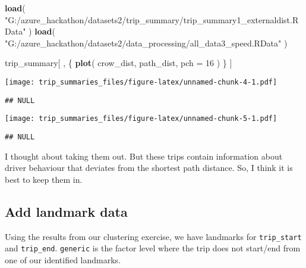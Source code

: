 \documentclass[]{article}
\newenvironment{Shaded}{\begin{snugshade}}{\end{snugshade}}
\newcommand{\DataTypeTok}[1]{\textcolor[rgb]{0.13,0.29,0.53}{#1}}
\newcommand{\DecValTok}[1]{\textcolor[rgb]{0.00,0.00,0.81}{#1}}
\newcommand{\KeywordTok}[1]{\textcolor[rgb]{0.13,0.29,0.53}{\textbf{#1}}}
\newcommand{\NormalTok}[1]{#1}
\newcommand{\OperatorTok}[1]{\textcolor[rgb]{0.81,0.36,0.00}{\textbf{#1}}}
\newcommand{\StringTok}[1]{\textcolor[rgb]{0.31,0.60,0.02}{#1}}
\begin{document}
\begin{Shaded}
\begin{Highlighting}[]
\KeywordTok{load}\NormalTok{( }\StringTok{"G:/azure_hackathon/datasets2/trip_summary/trip_summary1_externaldist.RData"}\NormalTok{ )}
\KeywordTok{load}\NormalTok{( }\StringTok{"G:/azure_hackathon/datasets2/data_processing/all_data3_speed.RData"}\NormalTok{ )}

\NormalTok{trip_summary[ , \{}
    \KeywordTok{plot}\NormalTok{( crow_dist, path_dist, }\DataTypeTok{pch =} \DecValTok{16}\NormalTok{ )}
\NormalTok{\} ]}
\end{Highlighting}
\end{Shaded}

\texttt{[image: trip\_summaries\_files/figure-latex/unnamed-chunk-4-1.pdf]}

\begin{verbatim}
## NULL
\end{verbatim}

\begin{Shaded}
\end{Shaded}

\texttt{[image: trip\_summaries\_files/figure-latex/unnamed-chunk-5-1.pdf]}

\begin{verbatim}
## NULL
\end{verbatim}

I thought about taking them out. But these trips contain information
about driver behaviour that deviates from the shortest path distance.
So, I think it is best to keep them in.

\hypertarget{add-landmark-data}{%
\subsection{Add landmark data}\label{add-landmark-data}}

Using the results from our clustering exercise, we have landmarks for
\texttt{trip\_start} and \texttt{trip\_end}. \texttt{generic} is the
factor level where the trip does not start/end from one of our
identified landmarks.
\end{document}
